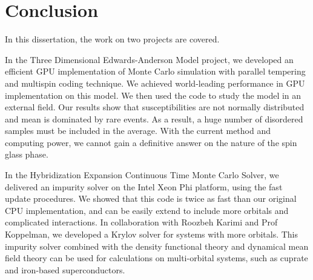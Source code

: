 \chapter{Conclusion}
In this dissertation, the work on two projects are covered.

In the Three Dimensional Edwards-Anderson Model project, we developed an efficient
GPU implementation of Monte Carlo simulation with parallel tempering and
multispin coding technique. We achieved world-leading performance in GPU 
implementation on this model. We then used the code to study the model in an 
external field. Our results show that susceptibilities are not normally distributed and mean is 
dominated by rare events. As a result, a huge number of disordered samples must 
be included in the average. With the current method and computing power, we
cannot gain a definitive answer on the nature of the spin glass phase. 

In the Hybridization Expansion Continuous Time Monte Carlo Solver, we delivered
an impurity solver on the Intel Xeon Phi platform, using the fast update procedures.
We showed that this code is twice as fast than our original CPU implementation, 
and can be easily extend to include more orbitals and complicated interactions.
In collaboration with Roozbeh Karimi and Prof Koppelman, we developed a Krylov 
solver for systems with more orbitals. This impurity solver combined with the 
density functional theory and dynamical mean field theory can be used for
calculations on multi-orbital systems, such as cuprate and iron-based superconductors. 



